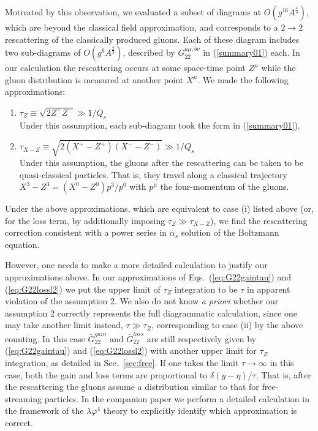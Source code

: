 \documentclass[onecolumn,showpacs,nobibnotes,nofootinbib,12pt,aps,prd,showpacs,notitlepage,nofootinbib,preprintnumbers,amsmath,amssymb]{article}
\newcommand{\as}{\alpha_s}
\begin{document}
Motivated by this observation, we evaluated a subset of diagrams at
$O(g^{16} A^{\frac{4}{3}})$, which are beyond the classical field
approximation, and corresponds to a $2\to 2$ rescattering of the
classically produced gluons. Each of these diagram includes two
sub-diagrams of $O(g^{6} A^{\frac{2}{3}})$, described by
$G_{22}^{a\mu,b\nu}$ in (\ref{summary01}) each. In our calculation the
rescattering occurs at some space-time point $Z^\mu$ while the gluon
distribution is measured at another point $X^\mu$. We made the
following approximations:
\begin{enumerate}
\item{$\tau_Z\equiv\sqrt{2Z^+Z^-} \gg 1/Q_s$}\\
  Under this assumption, each sub-diagram took the form in (\ref{summary01}). 
\item{$\tau_{X-Z}\equiv\sqrt{2(X^+-Z^+)(X^--Z^-)}\gg 1/Q_s$}\\
  Under this assumption, the gluons after the rescattering can be
  taken to be quasi-classical particles. That is, they travel along a
  classical trajectory $X^3-Z^3=(X^0-Z^0)p^3/p^0$ with $p^\mu$ the
  four-momentum of the gluons.
\end{enumerate}
Under the above approximations, which are equivalent to case (i)
listed above (or, for the loss term, by additionally imposing $\tau_Z
\gg \tau_{X-Z}$), we find the rescattering correction consistent with
a power series in $\as$ solution of the Boltzmann equation.


However, one needs to make a more detailed calculation to justify our
approximations above. In our approximations of
Eqs.~(\ref{eq:G22gaintau}) and (\ref{eq:G22lossl2}) we put the upper
limit of $\tau_Z$ integration to be $\tau$ in apparent violation of
the assumption 2. We also do not know {\sl a priori} whether our
assumption 2 correctly represents the full diagrammatic calculation,
since one may take another limit instead, $\tau\gg\tau_Z$,
corresponding to case (ii) by the above counting. In this case $\bar
G_{22}^{gain}$ and $\bar G_{22}^{loss}$ are still respectively given
by (\ref{eq:G22gaintau}) and (\ref{eq:G22lossl2}) with another upper
limit for $\tau_Z$ integration, as detailed in Sec.~\ref{sec:free}. If
one takes the limit $\tau\to \infty$ in this case, both the gain and
loss terms are proportional to $\delta(y-\eta)/\tau$. That is, after
the rescattering the gluons assume a distribution similar to that for
free-streaming particles. In the companion paper \cite{KovchegovWu} we
perform a detailed calculation in the framework of the $\lambda
\varphi^4$ theory to explicitly identify which approximation is
correct.
\end{document}
